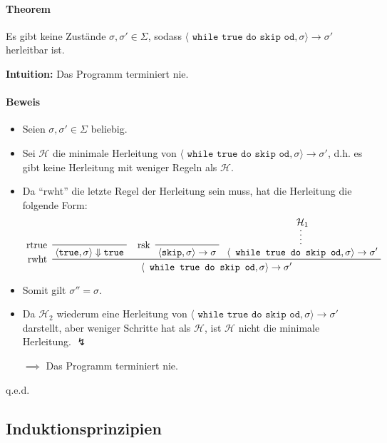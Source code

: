 \documentclass[a4paper, 11pt, accentcolor = tud3b]{tudreport}
\newcommand{\qed}{{\hfill q.e.d.}}
\newcommand{\subsubparagraph}[1]{\hspace{1cm} \textbf{#1:}}
\newcommand{\intuition}[1]{\subsubparagraph{Intuition} #1}
\begin{document}
				    \paragraph{Theorem}
					    Es gibt keine Zustände $ \sigma, \sigma' \in \Sigma $, sodass $ \langle \texttt{ while true do skip od}, \sigma \rangle \rightarrow \sigma' $ herleitbar ist.
					    
					    \intuition{Das Programm terminiert nie.}
				    
				    \paragraph{Beweis}
					    \begin{itemize}
						    \item Seien $ \sigma, \sigma' \in \Sigma $ beliebig.
						    \item Sei $ \mathcal{H} $ die minimale Herleitung von $ \langle \texttt{ while true do skip od}, \sigma \rangle \rightarrow \sigma' $, d.h. es gibt keine Herleitung mit weniger Regeln als $ \mathcal{H} $.
						    \item Da \enquote{rwht} die letzte Regel der Herleitung sein muss, hat die Herleitung die folgende Form:
							    \begin{equation*}
									\prftree[l]
										{ rwht }
										{ \prftree[l]{ rtrue }{ \langle \texttt{true}, \sigma \rangle \Downarrow \texttt{true} } }
										{ \prftree[l]{ rsk }{ \langle \texttt{skip}, \sigma \rangle \rightarrow \sigma } }
										{ \prfsummary{\mathcal{H} _ 1}{ \langle \texttt{ while true do skip od}, \sigma \rangle \rightarrow \sigma' } }
										{ \langle \texttt{ while true do skip od}, \sigma \rangle \rightarrow \sigma' }
							    \end{equation*}
							\item Somit gilt $ \sigma'' = \sigma $.
							\item Da $ \mathcal{H} _ 2 $ wiederum eine Herleitung von $ \langle \texttt{ while true do skip od}, \sigma \rangle \rightarrow \sigma' $ darstellt, aber weniger Schritte hat als $ \mathcal{H} $, ist $ \mathcal{H} $ nicht die minimale Herleitung. $ \lightning $
							\item[$ \implies $] Das Programm terminiert nie.
					    \end{itemize}
					    
					    \qed
		    
		    \subsection{Induktionsprinzipien}
\end{document}
